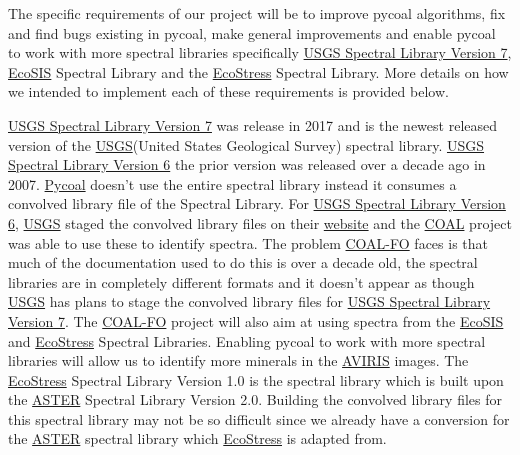 \documentclass[a4paper,12pt]{article}
\begin{document}
\newline


\noindent  The specific requirements of our project will be to improve pycoal algorithms, fix and find bugs existing in pycoal, make general improvements and enable pycoal to work with more spectral libraries specifically \href{https://speclab.cr.usgs.gov/spectral-lib.html}{USGS Spectral Library Version 7}, \href{https://ecosis.org/}{EcoSIS} Spectral Library and the \href{https://speclib.jpl.nasa.gov/}{EcoStress} Spectral Library. More details on how we intended to implement each of these requirements is provided below. \newline

\href{https://crustal.usgs.gov/speclab/QueryAll07a.php}{USGS Spectral Library Version 7} was release in 2017 and is the newest released version of the \href{https://www.usgs.gov/}{USGS}(United States Geological Survey) spectral library. \href{https://speclab.cr.usgs.gov/spectral.lib06/ds231/index.html}{USGS Spectral Library Version 6} the prior version was released over a decade ago in 2007. \href{https://github.com/capstone-coal/pycoal}{Pycoal} doesn’t use the entire spectral library instead it consumes a convolved library file of the Spectral Library. For \href{https://speclab.cr.usgs.gov/spectral.lib06/ds231/index.html}{USGS Spectral Library Version 6}, \href{https://www.usgs.gov/}{USGS} staged the convolved library files on their \href{ftp://ftpext.cr.usgs.gov/pub/cr/co/denver/speclab/pub/spectral.library/splib06.library/Convolved.libraries/}{website} and the \href{https://capstone-coal.github.io/}{COAL} project was able to use these to identify spectra. The problem \href{https://capstone-coal.github.io/team}{COAL-FO} faces is that much of the documentation used to do this is over a decade old, the spectral libraries are in completely different formats and it doesn’t appear as though \href{https://www.usgs.gov/}{USGS} has plans to stage the convolved library files for \href{https://crustal.usgs.gov/speclab/QueryAll07a.php}{USGS Spectral Library Version 7}.\newline
\newline
The \href{https://capstone-coal.github.io/team}{COAL-FO} project will also aim at using spectra from the \href{https://ecosis.org/}{EcoSIS} and \href{https://speclib.jpl.nasa.gov/}{EcoStress} Spectral Libraries. Enabling pycoal to work with more spectral libraries will allow us to identify more minerals in the \href{https://aviris.jpl.nasa.gov/}{AVIRIS} images. The \href{https://speclib.jpl.nasa.gov/}{EcoStress} Spectral Library Version 1.0 is the spectral library which is built upon the \href{https://speclib.jpl.nasa.gov/downloads/2009-Baldridge.pdf}{ASTER} Spectral Library Version 2.0. Building the convolved library files for this spectral library may not be so difficult since we already have a conversion for the \href{https://speclib.jpl.nasa.gov/downloads/2009-Baldridge.pdf}{ASTER} spectral library which \href{https://speclib.jpl.nasa.gov/}{EcoStress} is adapted from.
\end{document}
